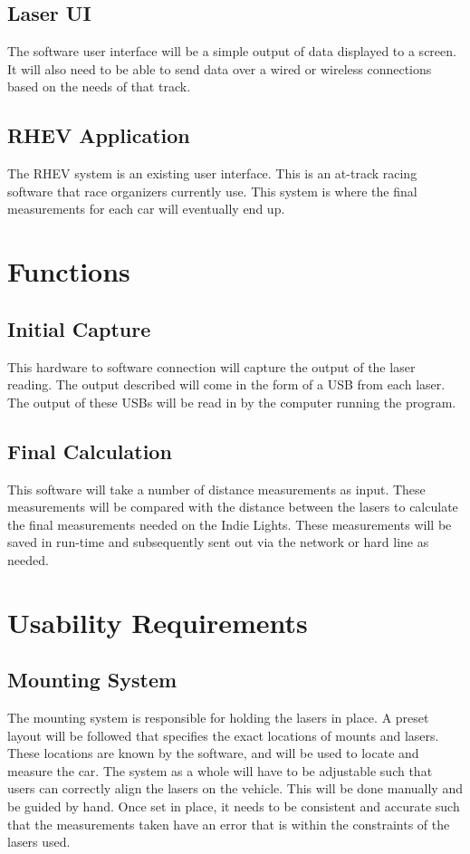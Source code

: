 \documentclass[draftclsnofoot,onecolumn,letterpaper,10pt,compsoc]{IEEEtran}
\begin{document}
\subsection{Laser UI}
The software user interface will be a simple output of data displayed to a screen. It will also need to be able to send data over a wired or wireless connections based on the needs of that track. 

\subsection{RHEV Application}
The RHEV system is an existing user interface.  This is an at-track racing software that race organizers currently use.  This system is where the final measurements for each car will eventually end up.

\section{Functions}
\subsection{Initial Capture}
This hardware to software connection will capture the output of the laser reading.  The output described will come in the form of a USB from each laser.  The output of these USBs will be read in by the computer running the program.

\subsection{Final Calculation}
This software will take a number of distance measurements as input.  These measurements will be compared with the distance between the lasers to calculate the final measurements needed on the Indie Lights.  These measurements will be saved in run-time and subsequently sent out via the network or hard line as needed.

\section{Usability Requirements}

\subsection{Mounting System}
The mounting system is responsible for holding the lasers in place. A preset layout will be followed that specifies the exact locations of mounts and lasers.  These locations are known by the software, and will be used to locate and measure the car. The system as a whole will have to be adjustable such that users can correctly align the lasers on the vehicle.  This will be done manually and be guided by hand. Once set in place, it needs to be consistent and accurate such that the measurements taken have an error that is within the constraints of the lasers used.
\end{document}
